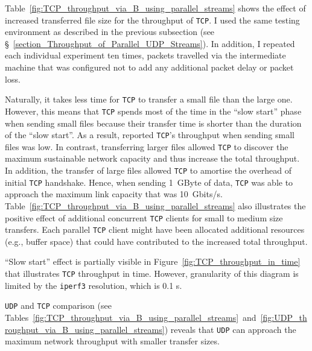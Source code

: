 \documentclass[12pt,a4paper,twoside,openright]{report}
\begin{document}
Table~\ref{fig:TCP_throughput_via_B_using_parallel_streams} shows the effect of increased transferred file size for the throughput of \texttt{TCP}.
I used  the same testing environment as described in the previous subsection (see \S~\ref{section_Throughput_of_Parallel_UDP_Streams}).
In addition, I repeated each individual experiment ten times, packets travelled via the intermediate machine that was configured not to add any additional packet delay or packet loss.

Naturally, it takes less time for \texttt{TCP} to transfer a small file than the large one.
However, this means that \texttt{TCP} spends most of the time in the \enquote{slow start} phase when sending small files because their transfer time is shorter than the duration of the \enquote{slow start}.
As a result, reported \texttt{TCP}'s throughput when sending small files was low.
In contrast, transferring larger files allowed \texttt{TCP} to discover the maximum sustainable network capacity and thus increase the total throughput.
In addition, the transfer of large files allowed \texttt{TCP} to amortise the overhead of initial \texttt{TCP} handshake.
Hence, when sending 1~GByte of data, \texttt{TCP} was able to approach the maximum link capacity that was 10~Gbits/s.
Table~\ref{fig:TCP_throughput_via_B_using_parallel_streams} also illustrates the positive effect of additional concurrent \texttt{TCP} clients for small to medium size transfers.
Each parallel \texttt{TCP} client might have been allocated additional resources (e.g., buffer space) that could have contributed to the increased total throughput.


\enquote{Slow start} effect is partially visible in Figure~\ref{fig:TCP_throughput_in_time} that illustrates \texttt{TCP} throughput in time.
However, granularity of this diagram is limited by the \texttt{iperf3} resolution, which is 0.1 s.

\texttt{UDP} and \texttt{TCP} comparison (see Tables~\ref{fig:TCP_throughput_via_B_using_parallel_streams}~and~\ref{fig:UDP_throughput_via_B_using_parallel_streams}) reveals that \texttt{UDP} can approach the maximum network throughput with smaller transfer sizes.
\end{document}
